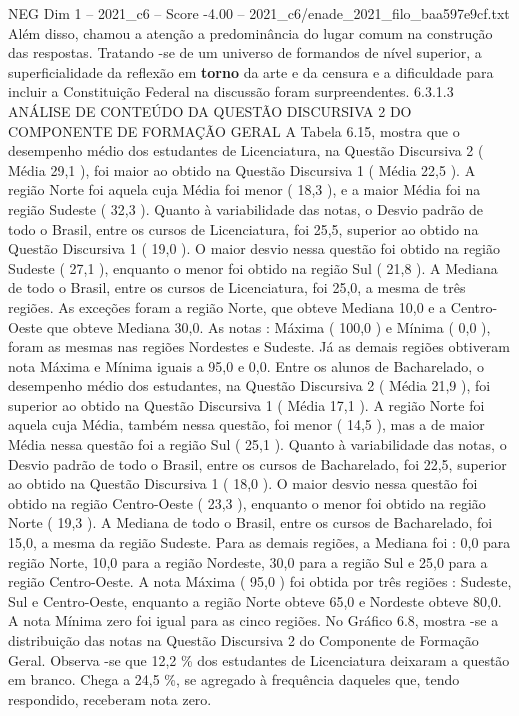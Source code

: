 \begin{textsample}{NEG Dim 1 – 2021\_c6 – Score -4.00 – 2021\_c6/enade\_2021\_filo\_baa597e9cf.txt}
Além disso, chamou a atenção a predominância do lugar comum na construção das respostas.
Tratando -se de um universo de formandos de nível superior, a superficialidade da reflexão em \textbf{torno} da arte e da censura e a dificuldade para incluir a Constituição Federal na discussão foram surpreendentes. 6.3.1.3 ANÁLISE DE CONTEÚDO DA QUESTÃO DISCURSIVA 2 DO COMPONENTE DE FORMAÇÃO GERAL A Tabela 6.15, mostra que o desempenho médio dos estudantes de Licenciatura, na Questão Discursiva 2 ( Média 29,1 ), foi maior ao obtido na Questão Discursiva 1 ( Média 22,5 ).
A região Norte foi aquela cuja Média foi menor ( 18,3 ), e a maior Média foi na região Sudeste ( 32,3 ).
Quanto à variabilidade das notas, o Desvio padrão de todo o Brasil, entre os cursos de Licenciatura, foi 25,5, superior ao obtido na Questão Discursiva 1 ( 19,0 ).
O maior desvio nessa questão foi obtido na região Sudeste ( 27,1 ), enquanto o menor foi obtido na região Sul ( 21,8 ).
A Mediana de todo o Brasil, entre os cursos de Licenciatura, foi 25,0, a mesma de três regiões.
As exceções foram a região Norte, que obteve Mediana 10,0 e a Centro-Oeste que obteve Mediana 30,0.
As notas : Máxima ( 100,0 ) e Mínima ( 0,0 ), foram as mesmas nas regiões Nordestes e Sudeste.
Já as demais regiões obtiveram nota Máxima e Mínima iguais a 95,0 e 0,0.
Entre os alunos de Bacharelado, o desempenho médio dos estudantes, na Questão Discursiva 2 ( Média 21,9 ), foi superior ao obtido na Questão Discursiva 1 ( Média 17,1 ).
A região Norte foi aquela cuja Média, também nessa questão, foi menor ( 14,5 ), mas a de maior Média nessa questão foi a região Sul ( 25,1 ).
Quanto à variabilidade das notas, o Desvio padrão de todo o Brasil, entre os cursos de Bacharelado, foi 22,5, superior ao obtido na Questão Discursiva 1 ( 18,0 ).
O maior desvio nessa questão foi obtido na região Centro-Oeste ( 23,3 ), enquanto o menor foi obtido na região Norte ( 19,3 ).
A Mediana de todo o Brasil, entre os cursos de Bacharelado, foi 15,0, a mesma da região Sudeste.
Para as demais regiões, a Mediana foi : 0,0 para região Norte, 10,0 para a região Nordeste, 30,0 para a região Sul e 25,0 para a região Centro-Oeste.
A nota Máxima ( 95,0 ) foi obtida por três regiões : Sudeste, Sul e Centro-Oeste, enquanto a região Norte obteve 65,0 e Nordeste obteve 80,0.
A nota Mínima zero foi igual para as cinco regiões.
No Gráfico 6.8, mostra -se a distribuição das notas na Questão Discursiva 2 do Componente de Formação Geral.
Observa -se que 12,2 \% dos estudantes de Licenciatura deixaram a questão em branco.
Chega a 24,5 \%, se agregado à frequência daqueles que, tendo respondido, receberam nota zero.

\end{textsample}
